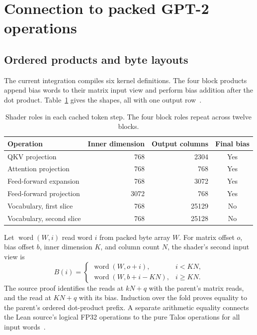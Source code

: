 \section{Connection to packed GPT-2 operations}

\subsection{Ordered products and byte layouts}

The current integration compiles six kernel definitions.  The four block products append bias words to their matrix input view and perform bias addition after the dot product.  Table~\ref{tab:kernels} gives the shapes, all with one output row~\cite{wg-packedsource}.

\begin{table}[ht]
\centering
\begin{tabular}{lrrc}
\toprule
Operation & Inner dimension & Output columns & Final bias\\
\midrule
QKV projection & 768 & 2304 & Yes\\
Attention projection & 768 & 768 & Yes\\
Feed-forward expansion & 768 & 3072 & Yes\\
Feed-forward projection & 3072 & 768 & Yes\\
Vocabulary, first slice & 768 & 25129 & No\\
Vocabulary, second slice & 768 & 25128 & No\\
\bottomrule
\end{tabular}
\caption{Shader roles in each cached token step.  The four block roles repeat across twelve blocks.}
\label{tab:kernels}
\end{table}

Let $\operatorname{word}(W,i)$ read word $i$ from packed byte array $W$.  For matrix offset $o$, bias offset $b$, inner dimension $K$, and column count $N$, the shader's second input view is
\[
B(i)=\begin{cases}
\operatorname{word}(W,o+i),&i<KN,\\
\operatorname{word}(W,b+i-KN),&i\geq KN.
\end{cases}
\]
The source proof identifies the reads at $kN+q$ with the parent's matrix reads, and the read at $KN+q$ with its bias.  Induction over the fold proves equality to the parent's ordered dot-product prefix.  A separate arithmetic equality connects the Lean source's logical FP32 operations to the pure Talos operations for all input words~\cite{wg-packedsource}.

